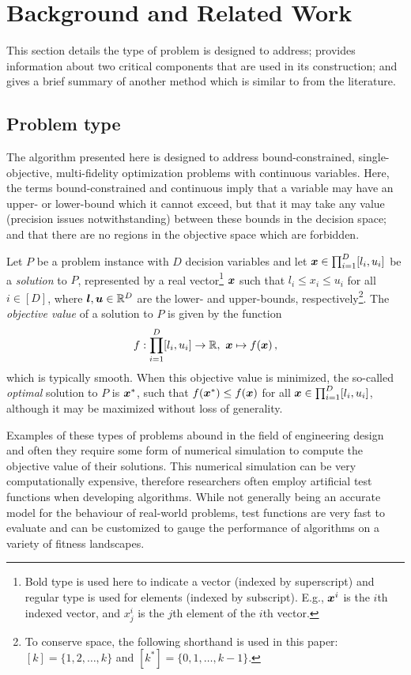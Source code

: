 \section{Background and Related Work}\label{sec:back}
This section details the type of problem \AlgName{} is designed to address; provides information about two critical components that are used in its construction; and gives a brief summary of another method which is similar to \AlgName{} from the literature.

\subsection{Problem type}
The algorithm presented here is designed to address bound-constrained, single-objective, multi-fidelity optimization problems with continuous variables. Here, the terms bound-constrained and continuous imply that a variable may have an upper- or lower-bound which it cannot exceed, but that it may take any value (precision issues notwithstanding) between these bounds in the decision space; and that there are no regions in the objective space which are forbidden. 

Let $P$ be a problem instance with $D$ decision variables and let $\boldsymbol{x} \in \prod^D_{i=1}[l_i,u_i]$ be a \emph{solution} to $P$, represented by a real vector\footnote{Bold type is used here to indicate a vector (indexed by superscript) and regular type is used for elements (indexed by subscript). E.g., $\boldsymbol{x}^i$ is the $i$th indexed vector, and $x_j^i$ is the $j$th element of the $i$th vector.} $\boldsymbol{x}$ such that $l_i \le x_i \le u_i$ for all ${i \in [D]}$, where $\boldsymbol{l},\boldsymbol{u} \in \mathbb{R}^D$ are the lower- and upper-bounds, respectively\footnote{To conserve space, the following shorthand is used in this paper: ${[k] = \{1,2,\dots,k\}}$ and $[k^*] = \{0,1,\dots,k-1\}$.}. The \emph{objective value} of a solution to $P$ is given by the function
\begin{equation}
f:\displaystyle\prod^D_{i=1}[l_i,u_i]\to \mathbb{R},\ \boldsymbol{x} \mapsto f(\boldsymbol{x})\,, \label{eq:objective}
\end{equation}
which is typically smooth. When this objective value is minimized, the so-called \emph{optimal} solution to $P$ is $\boldsymbol{x}^*$, such that $f(\boldsymbol{x}^*) \leq f(\boldsymbol{x})$ for all $\boldsymbol{x} \in \prod^D_{i=1}[l_i,u_i]$, although it may be maximized without loss of generality.

Examples of these types of problems abound in the field of engineering design~\cite{deb2012optimization,forrester2008engineering} and often they require some form of numerical simulation to compute the objective value of their solutions. This numerical simulation can be very computationally expensive, therefore researchers often employ artificial test functions when developing algorithms. While not generally being an accurate model for the behaviour of real-world problems, test functions are very fast to evaluate and can be customized to gauge the performance of algorithms on a variety of fitness landscapes.

